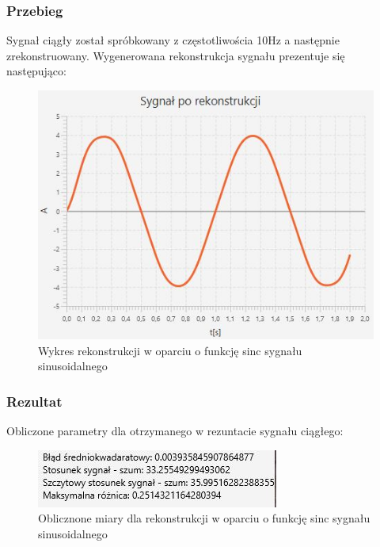 \documentclass[12pt]{article}
\begin{document}
\subsubsection{Przebieg}
Sygnał ciągły został spróbkowany z częstotliwościa 10Hz a następnie zrekonstruowany.
Wygenerowana rekonstrukcja sygnału prezentuje się następująco:
\begin{figure}[H]
	\centering
	\includegraphics[width=\linewidth]{sygnal_sinc.jpg}
	\caption{Wykres rekonstrukcji w oparciu o funkcję sinc sygnału sinusoidalnego}
	\label{wykres dla eksperymentu 5}
\end{figure}



\subsubsection{Rezultat}
Obliczone parametry dla otrzymanego w rezuntacie sygnału ciągłego:
\begin{figure}[H]
	\centering
	\includegraphics[width=\linewidth]{wyniki_sinc.jpg}
	\caption{Oblicznone miary dla rekonstrukcji w oparciu o funkcję sinc sygnału sinusoidalnego}
	\label{wartości dla eksperymentu 5}
\end{figure}
\end{document}
